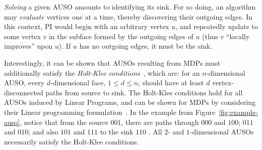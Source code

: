 



\textit{Solving} a given AUSO amounts to identifying its sink. For so doing, an algorithm may \textit{evaluate} vertices one at a time, thereby discovering their outgoing edges. In this context, PI would begin with an arbitrary vertex $u$, and repeatedly update to some vertex $v$ in the subface formed by the outgoing edges of $u$ (thus $v$ ``locally improves'' upon $u$). If $u$ has no outgoing edges, it must be the sink.

Interestingly, it can be shown that AUSOs resulting from MDPs must additionally satisfy the \textit{Holt-Klee conditions}~\cite{Holt+Klee:1999}, which are: for an $n$-dimensional AUSO, every $d$-dimensional face, $1 \leq d \leq n$, should have at least $d$ vertex-disconnected paths from source to sink. The Holt-Klee conditions hold for all AUSOs induced by Linear Programs, and can be shown for MDPs by considering their Linear programming formulation~\cite{Post+Ye:2013}. In the example from Figure~\ref{fig:example-auso}, notice that from the source $001$, there are paths through $000$ and $100$; $011$ and $010$; and also $101$ and $111$ to the sink $110$ . All $2$- and $1$-dimensional AUSOs necessarily satisfy the Holt-Klee conditions.


